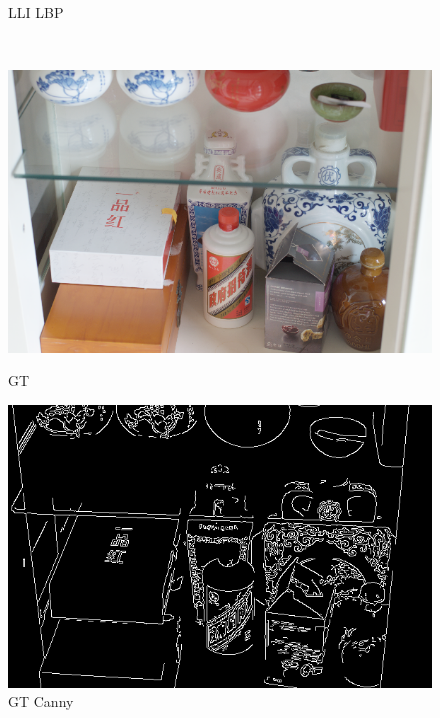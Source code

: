 \documentclass[CJK,aspectratio=169]{beamer}  %
\begin{document}
\begin{frame}
\begin{figure}
\begin{minipage}{.19\textwidth}
				\caption*{\tiny LLI LBP}
				\label{fig: LLI_lbp}	
			\end{minipage}\\
			\vspace{-0.2cm}
			\begin{minipage}{.19\textwidth}
				\centering
				\includegraphics[width=\linewidth]{picture/LLIE/My Architecture/Edge Detection/normal00044}
				\caption*{\tiny GT}
				\label{fig: GI}
			\end{minipage}
			\begin{minipage}{.19\textwidth}
				\centering
				\includegraphics[width=\linewidth]{picture/LLIE/My Architecture/Edge Detection/normal00044_canny}
				\caption*{\tiny GT Canny}
				\label{fig: GT_canny}	
			\end{minipage}
			\begin{minipage}{.19\textwidth}
				\centering

\end{minipage}
\end{figure}
\end{frame}
\end{document}
